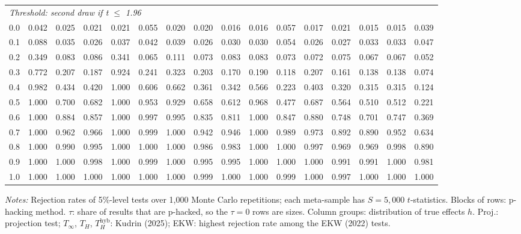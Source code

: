 \begin{table}[htbp]
\begin{tabular}{lccccccccccccccc}
\midrule
\multicolumn{16}{l}{\textit{Threshold: second draw if t $\le$ 1.96}} \\
0.0 & 0.042 & 0.025 & 0.021 & 0.021 & 0.055 & 0.020 & 0.020 & 0.016 & 0.016 & 0.057 & 0.017 & 0.021 & 0.015 & 0.015 & 0.039 \\
0.1 & 0.088 & 0.035 & 0.026 & 0.037 & 0.042 & 0.039 & 0.026 & 0.030 & 0.030 & 0.054 & 0.026 & 0.027 & 0.033 & 0.033 & 0.047 \\
0.2 & 0.349 & 0.083 & 0.086 & 0.341 & 0.065 & 0.111 & 0.073 & 0.083 & 0.083 & 0.073 & 0.072 & 0.075 & 0.067 & 0.067 & 0.052 \\
0.3 & 0.772 & 0.207 & 0.187 & 0.924 & 0.241 & 0.323 & 0.203 & 0.170 & 0.190 & 0.118 & 0.207 & 0.161 & 0.138 & 0.138 & 0.074 \\
0.4 & 0.982 & 0.434 & 0.420 & 1.000 & 0.606 & 0.662 & 0.361 & 0.342 & 0.566 & 0.223 & 0.403 & 0.320 & 0.315 & 0.315 & 0.124 \\
0.5 & 1.000 & 0.700 & 0.682 & 1.000 & 0.953 & 0.929 & 0.658 & 0.612 & 0.968 & 0.477 & 0.687 & 0.564 & 0.510 & 0.512 & 0.221 \\
0.6 & 1.000 & 0.884 & 0.857 & 1.000 & 0.997 & 0.995 & 0.835 & 0.811 & 1.000 & 0.847 & 0.880 & 0.748 & 0.701 & 0.747 & 0.369 \\
0.7 & 1.000 & 0.962 & 0.966 & 1.000 & 0.999 & 1.000 & 0.942 & 0.946 & 1.000 & 0.989 & 0.973 & 0.892 & 0.890 & 0.952 & 0.634 \\
0.8 & 1.000 & 0.990 & 0.995 & 1.000 & 1.000 & 1.000 & 0.986 & 0.983 & 1.000 & 1.000 & 0.997 & 0.969 & 0.969 & 0.998 & 0.890 \\
0.9 & 1.000 & 1.000 & 0.998 & 1.000 & 0.999 & 1.000 & 0.995 & 0.995 & 1.000 & 1.000 & 1.000 & 0.991 & 0.991 & 1.000 & 0.981 \\
1.0 & 1.000 & 1.000 & 1.000 & 1.000 & 1.000 & 1.000 & 0.999 & 1.000 & 1.000 & 0.999 & 1.000 & 0.997 & 1.000 & 1.000 & 1.000 \\
\bottomrule
\end{tabular}
\par\smallskip
\begin{minipage}{\linewidth}\footnotesize\textit{Notes:} Rejection rates of 5\%-level tests over 1,000 Monte Carlo repetitions; each meta-sample has $S = 5{,}000$ $t$-statistics. Blocks of rows: p-hacking method. $\tau$: share of results that are p-hacked, so the $\tau = 0$ rows are sizes. Column groups: distribution of true effects $h$. Proj.: projection test; $T_\infty$, $T_H$, $T_H^{\mathrm{hyb}}$: Kudrin (2025); EKW: highest rejection rate among the EKW (2022) tests.\end{minipage}
\end{table}
